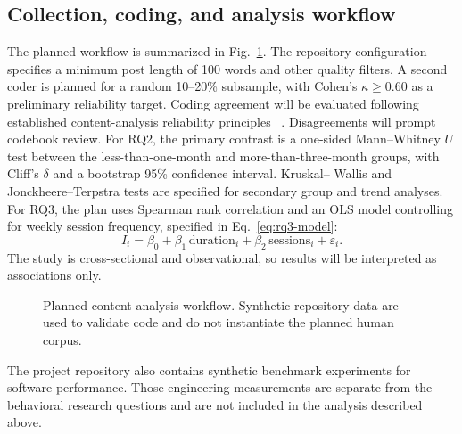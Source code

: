 \subsection{Collection, coding, and analysis workflow}
\label{subsec:workflow}

The planned workflow is summarized in Fig.~\ref{fig:workflow}. The repository
configuration specifies a minimum post length of 100 words and other quality
filters. 
A second coder is planned for a random
10--20\% subsample, with Cohen's
$\kappa\geq 0.60$ as a preliminary
reliability target. Coding agreement will
be evaluated following established
content-analysis reliability principles~
\cite{krippendorffReliability2004}.
Disagreements will prompt codebook review.
For RQ2, the primary contrast is a one-sided Mann--Whitney
$U$ test between the less-than-one-month and more-than-three-month groups,
with Cliff's $\delta$ and a bootstrap 95\% confidence interval. Kruskal--
Wallis and Jonckheere--Terpstra tests are specified for secondary group and
trend analyses. For RQ3, the plan uses Spearman rank correlation and an OLS
model controlling for weekly session frequency, specified in
Eq.~\eqref{eq:rq3-model}:
\begin{equation}
  I_i = \beta_0 + \beta_1\,\mathrm{duration}_i
      + \beta_2\,\mathrm{sessions}_i + \varepsilon_i.
  \label{eq:rq3-model}
\end{equation}
The study is cross-sectional and observational, so results will be
interpreted as associations only.


\begin{figure}[t]
  \centering
  \caption{Planned content-analysis workflow. Synthetic repository data are
  used to validate code and do not instantiate the planned human corpus.}
  \label{fig:workflow}
\end{figure}

The project repository also contains synthetic benchmark experiments for
software performance. Those engineering measurements are separate from the
behavioral research questions and are not included in the analysis described
above.
